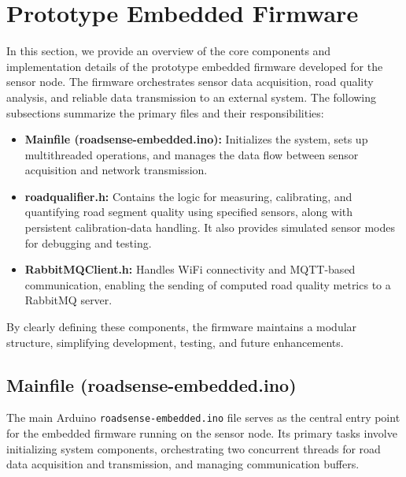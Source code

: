 \section{Prototype Embedded Firmware}

In this section, we provide an overview of the core components and implementation details of the prototype embedded firmware developed for the sensor node. The firmware orchestrates sensor data acquisition, road quality analysis, and reliable data transmission to an external system.
The following subsections summarize the primary files and their responsibilities:

\begin{itemize}
    \item \textbf{Mainfile (roadsense-embedded.ino):} Initializes the system, sets up multithreaded operations, and manages the data flow between sensor acquisition and network transmission.
    \item \textbf{roadqualifier.h:} Contains the logic for measuring, calibrating, and quantifying road segment quality using specified sensors, along with persistent calibration-data handling. It also provides simulated sensor modes for debugging and testing.
    \item \textbf{RabbitMQClient.h:} Handles WiFi connectivity and MQTT-based communication, enabling the sending of computed road quality metrics to a RabbitMQ server.
\end{itemize}

By clearly defining these components, the firmware maintains a modular structure, simplifying development, testing, and future enhancements.

\subsection{Mainfile (roadsense-embedded.ino)}

The main Arduino \texttt{roadsense-embedded.ino} file serves as the central entry point for the embedded firmware running on the sensor node. Its primary tasks involve initializing system components, orchestrating two concurrent threads for road data acquisition and transmission, and managing communication buffers.

